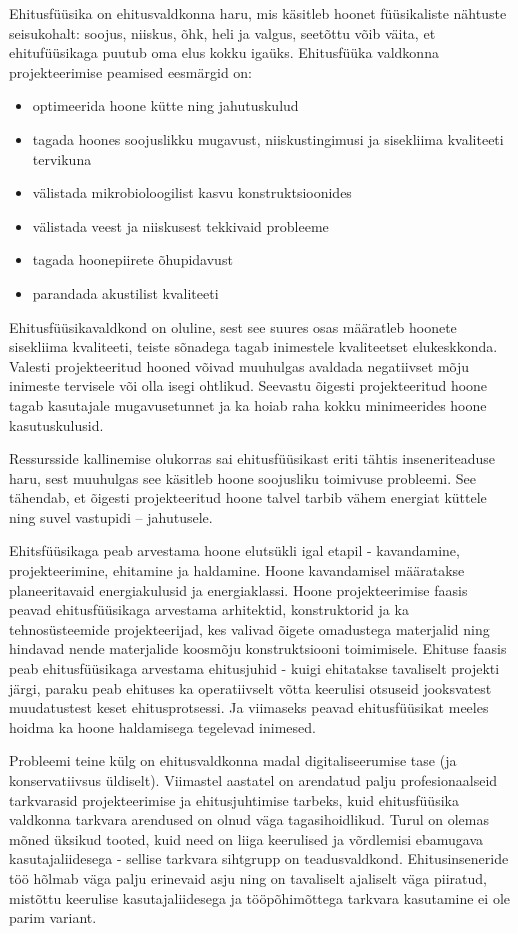 \label{chapters:introduction}
Ehitusfüüsika on ehitusvaldkonna haru, mis käsitleb hoonet füüsikaliste nähtuste seisukohalt: soojus, niiskus, õhk, heli ja valgus,
seetõttu võib väita, et ehitufüüsikaga puutub oma elus kokku igaüks.
Ehitusfüüka valdkonna projekteerimise peamised eesmärgid on:
\begin{itemize}
    \item optimeerida hoone kütte ning jahutuskulud
    \item tagada hoones soojuslikku mugavust, niiskustingimusi ja sisekliima kvaliteeti tervikuna
    \item välistada mikrobioloogilist kasvu konstruktsioonides
    \item välistada veest ja niiskusest tekkivaid probleeme
    \item tagada hoonepiirete õhupidavust
    \item parandada akustilist kvaliteeti
\end{itemize}

Ehitusfüüsikavaldkond on oluline, sest see suures osas määratleb hoonete sisekliima kvaliteeti, teiste sõnadega tagab inimestele kvaliteetset 
elukeskkonda. Valesti projekteeritud hooned võivad muuhulgas avaldada negatiivset mõju inimeste tervisele või olla isegi ohtlikud. 
Seevastu õigesti projekteeritud hoone tagab kasutajale mugavusetunnet ja ka hoiab raha kokku minimeerides hoone kasutuskulusid.

Ressursside kallinemise olukorras sai ehitusfüüsikast eriti tähtis inseneriteaduse haru, sest muuhulgas see käsitleb hoone soojusliku 
toimivuse probleemi. See tähendab, et õigesti projekteeritud hoone talvel tarbib vähem energiat küttele ning suvel vastupidi -- jahutusele.

Ehitsfüüsikaga peab arvestama hoone elutsükli igal etapil - kavandamine, projekteerimine, ehitamine ja haldamine. Hoone kavandamisel 
määratakse planeeritavaid energiakulusid ja energiaklassi. Hoone projekteerimise faasis peavad ehitusfüüsikaga arvestama arhitektid, 
konstruktorid ja ka tehnosüsteemide projekteerijad, kes valivad õigete omadustega materjalid ning hindavad nende materjalide koosmõju 
konstruktsiooni toimimisele. Ehituse faasis peab ehitusfüüsikaga arvestama ehitusjuhid - kuigi ehitatakse tavaliselt projekti järgi, 
paraku peab ehituses ka operatiivselt võtta keerulisi otsuseid jooksvatest muudatustest keset ehitusprotsessi. Ja viimaseks peavad 
ehitusfüüsikat meeles hoidma ka hoone haldamisega tegelevad inimesed.

Probleemi teine külg on ehitusvaldkonna madal digitaliseerumise tase (ja konservatiivsus üldiselt). Viimastel aastatel on 
arendatud palju profesionaalseid tarkvarasid projekteerimise ja ehitusjuhtimise tarbeks, kuid ehitusfüüsika valdkonna 
tarkvara arendused on olnud väga tagasihoidlikud. Turul on olemas mõned üksikud tooted, kuid need on liiga keerulised ja võrdlemisi 
ebamugava kasutajaliidesega - sellise tarkvara sihtgrupp on teadusvaldkond. Ehitusinseneride töö hõlmab väga palju erinevaid asju 
ning on tavaliselt ajaliselt väga piiratud, mistõttu keerulise kasutajaliidesega ja tööpõhimõttega tarkvara kasutamine ei ole parim variant. 

